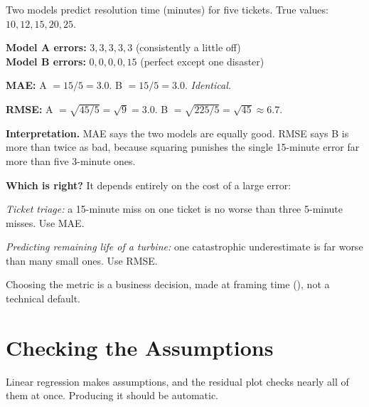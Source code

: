 \begin{worked}
Two models predict resolution time (minutes) for five tickets. True values:
$10, 12, 15, 20, 25$.

\smallskip
\textbf{Model A errors:} $3, 3, 3, 3, 3$ \quad (consistently a little off)\\
\textbf{Model B errors:} $0, 0, 0, 0, 15$ \quad (perfect except one disaster)

\smallskip
\textbf{MAE:} A $= 15/5 = 3.0$. \quad B $= 15/5 = 3.0$. \emph{Identical.}

\textbf{RMSE:} A $= \sqrt{45/5} = \sqrt{9} = 3.0$. \quad
B $= \sqrt{225/5} = \sqrt{45} \approx 6.7$.

\smallskip
\textbf{Interpretation.} MAE says the two models are equally good. RMSE says B is
more than twice as bad, because squaring punishes the single 15-minute error far
more than five 3-minute ones.

\textbf{Which is right?} It depends entirely on the cost of a large error:
\begin{tight}
  \item \emph{Ticket triage:} a 15-minute miss on one ticket is no worse than three
        5-minute misses. Use MAE.
  \item \emph{Predicting remaining life of a turbine:} one catastrophic
        underestimate is far worse than many small ones. Use RMSE.
\end{tight}
Choosing the metric is a business decision, made at framing time
(), not a technical default.
\end{worked}

\section{Checking the Assumptions}

Linear regression makes assumptions, and the residual plot checks nearly all of
them at once. Producing it should be automatic.


